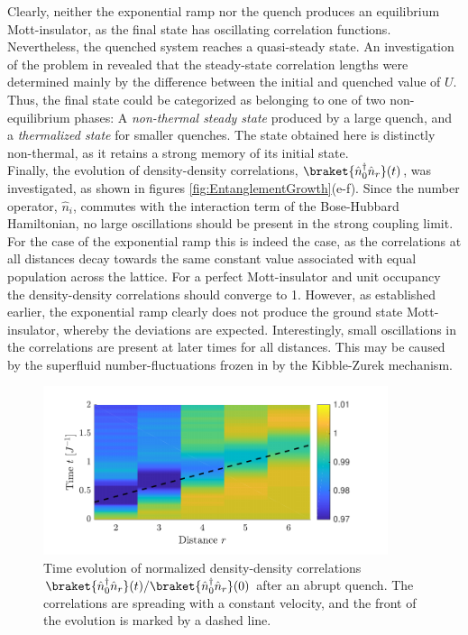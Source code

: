 Clearly, neither the exponential ramp nor the quench produces an equilibrium Mott-insulator, as the final state has oscillating correlation functions. Nevertheless, the quenched system reaches a quasi-steady state. An investigation of the problem in \cite{Kollath2007} revealed that the steady-state correlation lengths were determined mainly by the difference between the initial and quenched value of $U$. Thus, the final state could be categorized as belonging to one of two non-equilibrium phases: A \textit{non-thermal steady state} produced by a large quench, and a \textit{thermalized state} for smaller quenches. The state obtained here is distinctly non-thermal, as it retains a strong memory of its initial state.\\

Finally, the evolution of density-density correlations, $\braket{\hat{n}_{0}^{\dag} \hat{n}_{r}}(t)$, was investigated, as shown in figures \ref{fig:EntanglementGrowth}(e-f). Since the number operator, $\hat{n}_i$, commutes with the interaction term of the Bose-Hubbard Hamiltonian, no large oscillations should be present in the strong coupling limit. For the case of the exponential ramp this is indeed the case, as the correlations at all distances decay towards the same constant value associated with equal population across the lattice. For a perfect Mott-insulator and unit occupancy the density-density correlations should converge to 1. However, as established earlier, the exponential ramp clearly does not produce the ground state Mott-insulator, whereby the deviations are expected. Interestingly, small oscillations in the correlations are present at later times for all distances. This may be caused by the superfluid number-fluctuations frozen in by the Kibble-Zurek mechanism.
\begin{figure}[h!]
    \centering
    \includegraphics[width=0.9\textwidth]{Figures/L20/CorrelationLightCone.pdf}
    \caption{Time evolution of normalized density-density correlations $\braket{\hat{n}_{0}^{\dag} \hat{n}_{r}}(t) / \braket{\hat{n}_{0}^{\dag} \hat{n}_{r}}(0)$ after an abrupt quench. The correlations are spreading with a constant velocity, and the front of the evolution is marked by a dashed line.}
    \label{fig:CorrelationLightCone}
\end{figure}

